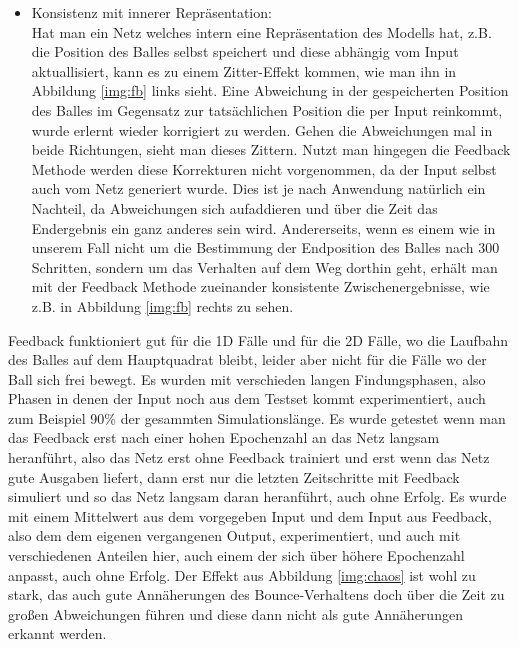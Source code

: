 \begin{description}
\begin{itemize}
		\item Konsistenz mit innerer Repräsentation: \hfill \\
		 Hat man ein Netz welches intern eine Repräsentation des Modells hat, z.B. die Position des Balles selbst speichert und diese abhängig vom Input aktuallisiert, kann es zu einem Zitter-Effekt kommen, wie man ihn in Abbildung \ref{img:fb} links sieht. Eine Abweichung in der gespeicherten Position des Balles im Gegensatz zur tatsächlichen Position die per Input reinkommt, wurde erlernt wieder korrigiert zu werden. Gehen die Abweichungen mal in beide Richtungen, sieht man dieses Zittern. Nutzt man hingegen die Feedback Methode werden diese Korrekturen nicht vorgenommen, da der Input selbst auch vom Netz generiert wurde. Dies ist je nach Anwendung natürlich ein Nachteil, da Abweichungen sich aufaddieren und über die Zeit das Endergebnis ein ganz anderes sein wird. Andererseits, wenn es einem wie in unserem Fall nicht um die Bestimmung der Endposition des Balles nach 300 Schritten, sondern um das Verhalten auf dem Weg dorthin geht, erhält man mit der Feedback Methode zueinander konsistente Zwischenergebnisse, wie z.B. in Abbildung \ref{img:fb} rechts zu sehen.
	\end{itemize}
	Feedback funktioniert gut für die 1D Fälle und für die 2D Fälle, wo die Laufbahn des Balles auf dem Hauptquadrat bleibt, leider aber nicht für die Fälle wo der Ball sich frei bewegt. Es wurden mit verschieden langen Findungsphasen, also Phasen in denen der Input noch aus dem Testset kommt experimentiert, auch zum Beispiel 90\% der gesammten Simulationslänge. Es wurde getestet wenn man das Feedback erst nach einer hohen Epochenzahl an das Netz langsam heranführt, also das Netz erst ohne Feedback trainiert und erst wenn das Netz gute Ausgaben liefert, dann erst nur die letzten Zeitschritte mit Feedback simuliert und so das Netz langsam daran heranführt, auch ohne Erfolg. Es wurde mit einem Mittelwert aus dem vorgegeben Input und dem Input aus Feedback, also dem dem eigenen vergangenen Output, experimentiert, und auch mit verschiedenen Anteilen hier, auch einem der sich über höhere Epochenzahl anpasst, auch ohne Erfolg. Der Effekt aus Abbildung \ref{img:chaos} ist wohl zu stark, das auch gute Annäherungen des Bounce-Verhaltens doch über die Zeit zu großen Abweichungen führen und diese dann nicht als gute Annäherungen erkannt werden. 
	

\end{description}
